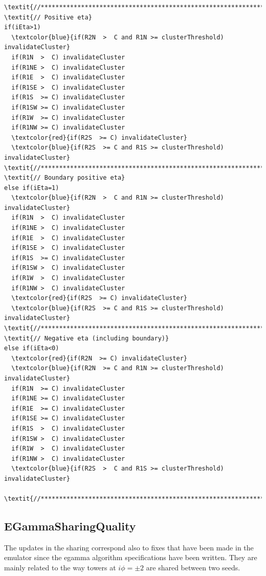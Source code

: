 \documentclass[a4paper, 12pt]{article}
\begin{document}
\begin{Verbatim}[label={Filtering updates}]
\textit{//******************************************************************//}
\textit{// Positive eta}
if(iEta>1) 
  \textcolor{blue}{if(R2N  >  C and R1N >= clusterThreshold) invalidateCluster}
  if(R1N  >  C) invalidateCluster
  if(R1NE >  C) invalidateCluster
  if(R1E  >  C) invalidateCluster
  if(R1SE >  C) invalidateCluster
  if(R1S  >= C) invalidateCluster
  if(R1SW >= C) invalidateCluster
  if(R1W  >= C) invalidateCluster
  if(R1NW >= C) invalidateCluster
  \textcolor{red}{if(R2S  >= C) invalidateCluster}
  \textcolor{blue}{if(R2S  >= C and R1S >= clusterThreshold) invalidateCluster}
\textit{//******************************************************************//}
\textit{// Boundary positive eta}
else if(iEta=1)
  \textcolor{blue}{if(R2N  >  C and R1N >= clusterThreshold) invalidateCluster}
  if(R1N  >  C) invalidateCluster
  if(R1NE >  C) invalidateCluster
  if(R1E  >  C) invalidateCluster
  if(R1SE >  C) invalidateCluster
  if(R1S  >= C) invalidateCluster
  if(R1SW >  C) invalidateCluster
  if(R1W  >  C) invalidateCluster
  if(R1NW >  C) invalidateCluster
  \textcolor{red}{if(R2S  >= C) invalidateCluster}
  \textcolor{blue}{if(R2S  >= C and R1S >= clusterThreshold) invalidateCluster}
\textit{//******************************************************************//}
\textit{// Negative eta (including boundary)}
else if(iEta<0)
  \textcolor{red}{if(R2N  >= C) invalidateCluster}
  \textcolor{blue}{if(R2N  >= C and R1N >= clusterThreshold) invalidateCluster}
  if(R1N  >= C) invalidateCluster
  if(R1NE >= C) invalidateCluster
  if(R1E  >= C) invalidateCluster
  if(R1SE >= C) invalidateCluster
  if(R1S  >  C) invalidateCluster
  if(R1SW >  C) invalidateCluster
  if(R1W  >  C) invalidateCluster
  if(R1NW >  C) invalidateCluster
  \textcolor{blue}{if(R2S  >  C and R1S >= clusterThreshold) invalidateCluster}

\textit{//******************************************************************//}
\end{Verbatim}


\subsection{EGammaSharingQuality}\label{sec:sharing1}
The updates in the sharing correspond also to fixes that have been made in the emulator since the egamma algorithm specifications have been written. They are mainly related to the way towers at $i\phi=\pm2$ are shared between two seeds.
\end{document}
